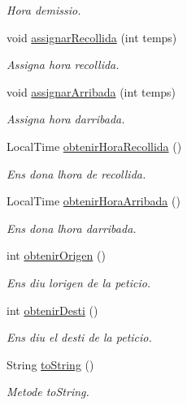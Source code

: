 \begin{DoxyCompactItemize}
\begin{DoxyCompactList}\small\item\em Hora d\textquotesingle{}emissio. \end{DoxyCompactList}\item 
void \hyperlink{class_portam_a_pro_p_1_1_peticio_en_tramit_a4a8abd30d88ea34909b4cb464ffb7c42}{assignar\+Recollida} (int temps)
\begin{DoxyCompactList}\small\item\em Assigna hora recollida. \end{DoxyCompactList}\item 
void \hyperlink{class_portam_a_pro_p_1_1_peticio_en_tramit_a59f97f6f782df87cf5e8df14859d966f}{assignar\+Arribada} (int temps)
\begin{DoxyCompactList}\small\item\em Assigna hora d\textquotesingle{}arribada. \end{DoxyCompactList}\item 
Local\+Time \hyperlink{class_portam_a_pro_p_1_1_peticio_en_tramit_afe2c9c5abe581786efdb4fb6495470ec}{obtenir\+Hora\+Recollida} ()
\begin{DoxyCompactList}\small\item\em Ens dona l\textquotesingle{}hora de recollida. \end{DoxyCompactList}\item 
Local\+Time \hyperlink{class_portam_a_pro_p_1_1_peticio_en_tramit_adf1b04d160bb3495c5c087fe7ddaee2e}{obtenir\+Hora\+Arribada} ()
\begin{DoxyCompactList}\small\item\em Ens dona l\textquotesingle{}hora d\textquotesingle{}arribada. \end{DoxyCompactList}\item 
int \hyperlink{class_portam_a_pro_p_1_1_peticio_en_tramit_ab789cc2fdc3c9244383e316b63d105b7}{obtenir\+Origen} ()
\begin{DoxyCompactList}\small\item\em Ens diu l\textquotesingle{}origen de la peticio. \end{DoxyCompactList}\item 
int \hyperlink{class_portam_a_pro_p_1_1_peticio_en_tramit_a7ab6e34a00489297a71dbe9ccae4aa51}{obtenir\+Desti} ()
\begin{DoxyCompactList}\small\item\em Ens diu el desti de la peticio. \end{DoxyCompactList}\item 
String \hyperlink{class_portam_a_pro_p_1_1_peticio_en_tramit_a3277b3163251c8862a89358055737189}{to\+String} ()
\begin{DoxyCompactList}\small\item\em Metode to\+String. \end{DoxyCompactList}\end{DoxyCompactItemize}


